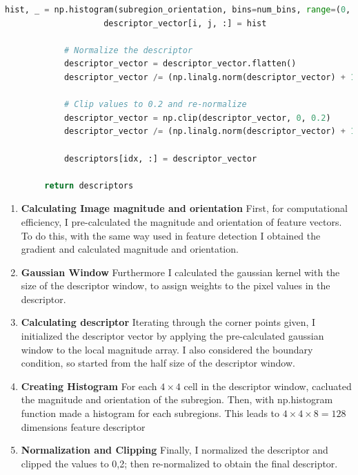 \begin{lstlisting}[language=python]
                    hist, _ = np.histogram(subregion_orientation, bins=num_bins, range=(0, 360), weights=subregion_w_mag)
                    descriptor_vector[i, j, :] = hist

            # Normalize the descriptor
            descriptor_vector = descriptor_vector.flatten()
            descriptor_vector /= (np.linalg.norm(descriptor_vector) + 1e-7) # Preventing division by zero

            # Clip values to 0.2 and re-normalize
            descriptor_vector = np.clip(descriptor_vector, 0, 0.2)
            descriptor_vector /= (np.linalg.norm(descriptor_vector) + 1e-7) 

            descriptors[idx, :] = descriptor_vector

        return descriptors
\end{lstlisting}

\begin{enumerate}
    \item \textbf{Calculating Image magnitude and orientation} First, for computational efficiency, I pre-calculated the magnitude and orientation of feature vectors. To do this, with the same way used in feature detection I obtained the gradient and calculated magnitude and orientation.
    \item \textbf{Gaussian Window} Furthermore I calculated the gaussian kernel with the size of the descriptor window, to assign weights to the pixel values in the descriptor.
    \item \textbf{Calculating descriptor} Iterating through the corner points given, I initialized the descriptor vector by applying the pre-calculated gaussian window to the local magnitude array. I also considered the boundary condition, so started from the half size of the descriptor window.
    \item \textbf{Creating Histogram} For each $4\times4$ cell in the descriptor window, cacluated the magnitude and orientation of the subregion. Then, with np.histogram function made a histogram for each subregions. This leads to $4\times4\times8=128$ dimensions feature descriptor
    \item \textbf{Normalization and Clipping} Finally, I normalized the descriptor and clipped the values to 0,2; then re-normalized to obtain the final descriptor.
\end{enumerate}

